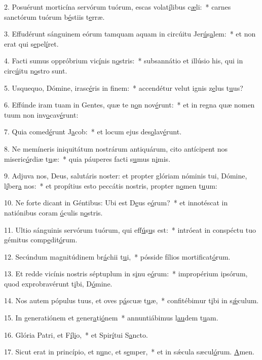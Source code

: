 2. Posuérunt morticína servórum tuórum, escas volat\uline{í}libus c\uline{æ}li:~* carnes sanctórum tuórum b\uline{é}stiis t\uline{e}rræ.\par 
3. Effudérunt sánguinem eórum tamquam aquam in circúitu Jer\uline{ú}s\uline{a}lem:~* et non erat qui s\uline{e}pel\uline{í}ret.\par 
4. Facti sumus oppróbrium vic\uline{í}nis n\uline{o}stris:~* subsannátio et illúsio his, qui in circ\uline{ú}itu n\uline{o}stro sunt.\par 
5. Usquequo, Dómine, irasc\uline{é}ris in f\uline{i}nem:~* accendétur velut ignis z\uline{e}lus t\uline{u}us?\par 
6. Effúnde iram tuam in Gentes, quæ te n\uline{o}n nov\uline{é}runt:~* et in regna quæ nomen tuum non inv\uline{o}cav\uline{é}runt:\par 
7. Quia comed\uline{é}runt J\uline{a}cob:~* et locum ejus des\uline{o}lav\uline{é}runt.\par 
8. Ne memíneris iniquitátum nostrárum antiquárum, cito antícipent nos miseric\uline{ó}rdiæ t\uline{u}æ:~* quia páuperes facti s\uline{u}mus n\uline{i}mis.\par 
9. Adjuva nos, Deus, salutáris noster: et propter glóriam nóminis tui, Dómine, l\uline{í}ber\uline{a} nos:~* et propítius esto peccátis nostris, propter n\uline{o}men t\uline{u}um:\par 
10. Ne forte dicant in Géntibus: Ubi est D\uline{e}us e\uline{ó}rum?~* et innotéscat in natiónibus coram \uline{ó}culis n\uline{o}stris.\par 
11. Ultio sánguinis servórum tuórum, qui eff\uline{ú}s\uline{u}s est:~* intróeat in conspéctu tuo gémitus comp\uline{e}dit\uline{ó}rum.\par 
12. Secúndum magnitúdinem br\uline{á}chii t\uline{u}i,~* pósside fílios mortif\uline{i}cat\uline{ó}rum.\par 
13. Et redde vicínis nostris séptuplum in s\uline{i}nu e\uline{ó}rum:~* impropérium ipsórum, quod exprobravérunt t\uline{i}bi, D\uline{ó}mine.\par 
14. Nos autem pópulus tuus, et oves p\uline{á}scuæ t\uline{u}æ,~* confitébimur t\uline{i}bi in s\uline{ǽ}culum.\par 
15. In generatiónem et gener\uline{a}ti\uline{ó}nem~* annuntiábimus l\uline{au}dem t\uline{u}am.\par 
16. Glória Patri, et F\uline{í}l\uline{i}o,~* et Spir\uline{í}tui S\uline{a}ncto.\par 
17. Sicut erat in princípio, et n\uline{u}nc, et s\uline{e}mper,~* et in sǽcula sæcul\uline{ó}rum. \uline{A}men.\par 
